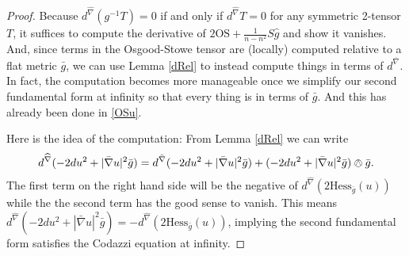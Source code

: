 \documentclass{amsart}
\begin{document}
\begin{proof}
Because $d^{\widehat{\nabla}}(g^{-1}T) = 0$ if and only if $d^{\widehat{\nabla}}T = 0$ for any symmetric 2-tensor $T$, it suffices to compute the derivative of $2\mathrm{OS} + \frac{1}{n-n^2}S\hat{g}$ and show it vanishes.
And, since terms in the Osgood-Stowe tensor are (locally) computed relative to a flat metric $\bar{g}$, we can use Lemma \ref{dRel} to instead compute things in terms of $d^{\bar{\nabla}}$.
In fact, the computation becomes more manageable once we simplify our second fundamental form at infinity so that every thing is in terms of $\bar{g}$.
And this has already been done in \eqref{OSu}.

Here is the idea of the computation:
From Lemma \ref{dRel} we can write
\begin{equation}
\label{ToComp}
d^{\widehat{\nabla}}(- 2 du^2 + |\bar{\nabla}u|^2 \bar{g}) = d^{\bar{\nabla}}(- 2 du^2 + |\bar{\nabla}u|^2 \bar{g}) + (- 2 du^2 + |\bar{\nabla}u|^2 \bar{g})\owedge \bar{g}.
\end{equation}
The first term on the right hand side will be the negative of $d^{\widehat{\nabla}}(2\mathrm{Hess}_{\bar{g}}(u))$ while the the second term has the good sense to vanish. 
This means $d^{\widehat{\nabla}}(- 2 du^2 + |\bar{\nabla}u|^2 \bar{g}) = - d^{\widehat{\nabla}}(2\mathrm{Hess}_{\bar{g}}(u))$, implying the second fundamental form satisfies the Codazzi equation at infinity.


\end{proof}
\end{document}
